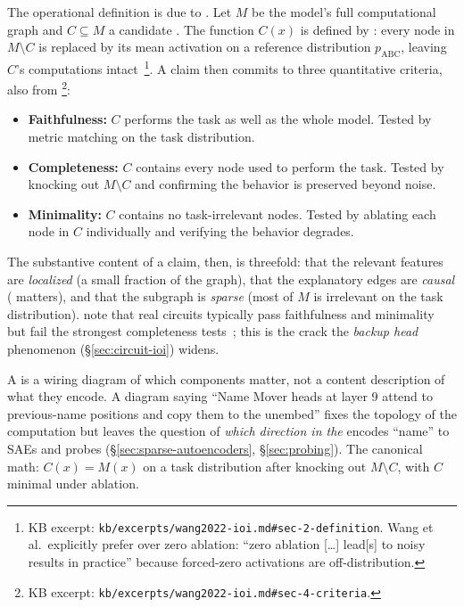 The operational definition is due to \citet{wang2022-ioi}. Let $M$ be
the model's full computational graph and $C \subseteq M$ a candidate
. The function $C(x)$ is defined by \emph{}: every node
in $M \setminus C$ is replaced by its mean activation on a reference
distribution $p_{\text{ABC}}$, leaving $C$'s computations
intact~\citep[\S 2]{wang2022-ioi}\footnote{KB excerpt:
\texttt{kb/excerpts/wang2022-ioi.md\#sec-2-definition}. Wang et al.\
explicitly prefer  over zero ablation: ``zero ablation
[\ldots] lead[s] to noisy results in practice'' because forced-zero
activations are off-distribution.}. A \glsterm{circuit}{circuit} claim then commits to
three quantitative criteria, also from
\citet[\S 4]{wang2022-ioi}\footnote{KB excerpt:
\texttt{kb/excerpts/wang2022-ioi.md\#sec-4-criteria}.}:
\begin{itemize}
  \item \textbf{Faithfulness:} $C$ performs the task as well as the
    whole model. Tested by metric matching on the task distribution.
  \item \textbf{Completeness:} $C$ contains every node used to perform
    the task. Tested by knocking out $M \setminus C$ and confirming
    the behavior is preserved beyond noise.
  \item \textbf{Minimality:} $C$ contains no task-irrelevant nodes.
    Tested by ablating each node in $C$ individually and verifying the
    behavior degrades.
\end{itemize}
The substantive content of a  claim, then, is threefold: that
the relevant features are \emph{localized} (a small fraction of the
graph), that the explanatory edges are \emph{causal} ( matters),
and that the subgraph is \emph{sparse} (most of $M$ is irrelevant on
the task distribution). \citet{wang2022-ioi} note that real circuits
typically pass faithfulness and minimality but fail the strongest
completeness tests~\citep[\S 4]{wang2022-ioi}; this is the crack the
\emph{backup head} phenomenon (\S\ref{sec:circuit-ioi}) widens.

\begin{intuition}
A  is a wiring diagram of which components matter, not a content
description of what they encode. A diagram saying ``Name Mover heads at
layer 9 attend to previous-name positions and copy them to the
unembed'' fixes the topology of the computation but leaves the question
of \emph{which direction in the } encodes ``name'' to
SAEs and probes (\S\ref{sec:sparse-autoencoders}, \S\ref{sec:probing}).
The canonical math: $C(x) = M(x)$ on a task distribution after knocking
out $M \setminus C$, with $C$ minimal under ablation.
\end{intuition}

